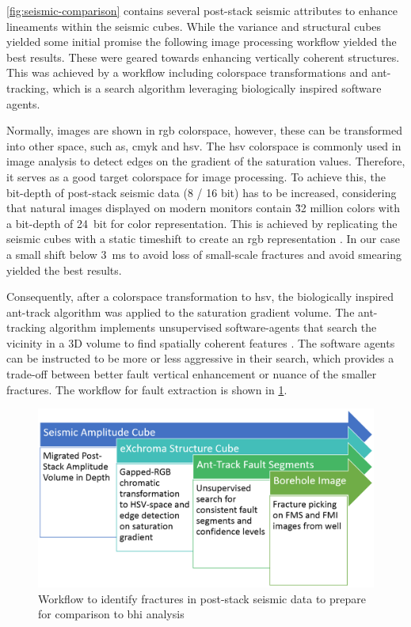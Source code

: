 \cref{fig:seismic-comparison} contains several post-stack seismic attributes to enhance lineaments within the seismic cubes. While the variance and structural cubes yielded some initial promise the following image processing workflow yielded the best results. These were geared towards enhancing vertically coherent structures. This was achieved by a workflow including colorspace transformations and ant-tracking, which is a search algorithm leveraging biologically inspired software agents.

Normally, images are shown in \ac{rgb} colorspace, however, these can be transformed into other space, such as, \ac{cmyk} and \ac{hsv}. The \ac{hsv} colorspace is commonly used in image analysis to detect edges on the gradient of the saturation values. Therefore, it serves as a good target colorspace for image processing. To achieve this, the bit-depth of post-stack seismic data (8 / 16 bit) has to be increased, considering that natural images displayed on modern monitors contain \~32 million colors with a bit-depth of 24~bit for color representation.
This is achieved by replicating the seismic cubes with a static timeshift to create an \ac{rgb} representation \citep{laake2014structural}. In our case a small shift below 3~ms to avoid loss of small-scale fractures and avoid smearing yielded the best results. 

Consequently, after a colorspace transformation to \ac{hsv}, the biologically inspired ant-track algorithm was applied to the saturation gradient volume. The ant-tracking algorithm implements unsupervised software-agents that search the vicinity in a 3D volume to find spatially coherent features \citep{dorigo1992optimization}. The software agents can be instructed to be more or less aggressive in their search, which provides a trade-off between better fault vertical enhancement or nuance of the smaller fractures. The workflow for fault extraction is shown in \cref{fig:seismic-workflow}.

\begin{figure}[!ht]
    \centering
    \includegraphics[width=\textwidth]{figures/fracture-workflow.PNG}
    \caption{Workflow to identify fractures in post-stack seismic data to prepare for comparison to \ac{bhi} analysis}
    \label{fig:seismic-workflow}
\end{figure}

